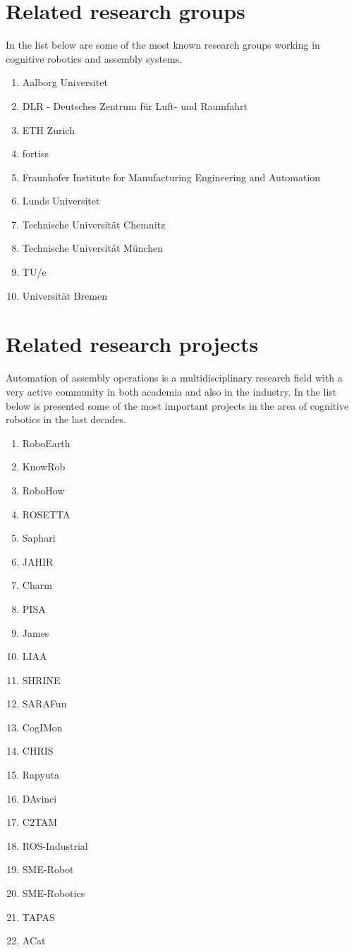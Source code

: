 \section{Related research groups}

In the list below are some of the most known research groups working in cognitive robotics and assembly systems.

\begin{enumerate}
	\item Aalborg Universitet
	\item DLR - Deutsches Zentrum für Luft- und Raumfahrt
	\item ETH Zurich
	\item fortiss
	\item Fraunhofer Institute for Manufacturing Engineering and Automation
	\item Lunds Universitet
	\item Technische Universität Chemnitz
	\item Technische Universität München
	\item TU/e
	\item Universität Bremen
\end{enumerate}


\section{Related research projects}

Automation of assembly operations is a multidisciplinary research field with a very active community in both academia and also in the industry. In the list below is presented some of the most important projects in the area of cognitive robotics in the last decades.

\begin{multicols}{4}
	\begin{enumerate}
		\item RoboEarth
		\item KnowRob
		\item RoboHow
		\item ROSETTA
		\item Saphari
		\item JAHIR
		\item Charm
		\item PISA
		\item James
		\item LIAA
		\item SHRINE
		\item SARAFun
		\item CogIMon
		\item CHRIS
		\item Rapyuta
		\item DAvinci
		\item C2TAM
		\item ROS-Industrial
		\item SME-Robot
		\item SME-Robotics
		\item TAPAS
		\item ACat
	\end{enumerate}
\end{multicols}



